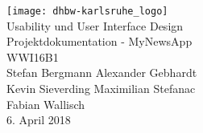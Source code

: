 
\begin{titlepage}
   \pagestyle{empty}
   \centering
   \texttt{[image: dhbw-karlsruhe\_logo]}\qquad
   \mbox{}\vspace{4\baselineskip}\\
   \rmfamily\Large
   \centering
   Usability und User Interface Design
   \vspace{1\baselineskip}\\
   \sffamily\huge
   \centering
   Projektdokumentation - MyNewsApp
   \vspace{1\baselineskip}\\
   \rmfamily
   \normalsize
   WWI16B1
   \vspace{1\baselineskip}\\
   
   Stefan Bergmann Alexander Gebhardt\\
   Kevin Sieverding Maximilian Stefanac\\
   Fabian Wallisch
   \vspace{3\baselineskip}\\

   6. April 2018


\end{titlepage}

